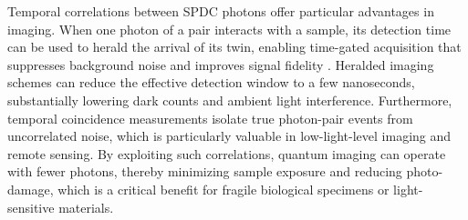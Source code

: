 Temporal correlations between SPDC photons offer particular advantages in imaging. When one photon of a pair interacts with a sample, its detection time can be used to herald the arrival of its twin, enabling time-gated acquisition that suppresses background noise and improves signal fidelity \cite{Moreau2019}. Heralded imaging schemes can reduce the effective detection window to a few nanoseconds, substantially lowering dark counts and ambient light interference. Furthermore, temporal coincidence measurements isolate true photon-pair events from uncorrelated noise, which is particularly valuable in low-light-level imaging and remote sensing. By exploiting such correlations, quantum imaging can operate with fewer photons, thereby minimizing sample exposure and reducing photo-damage, which is a critical benefit for fragile biological specimens or light-sensitive materials.




